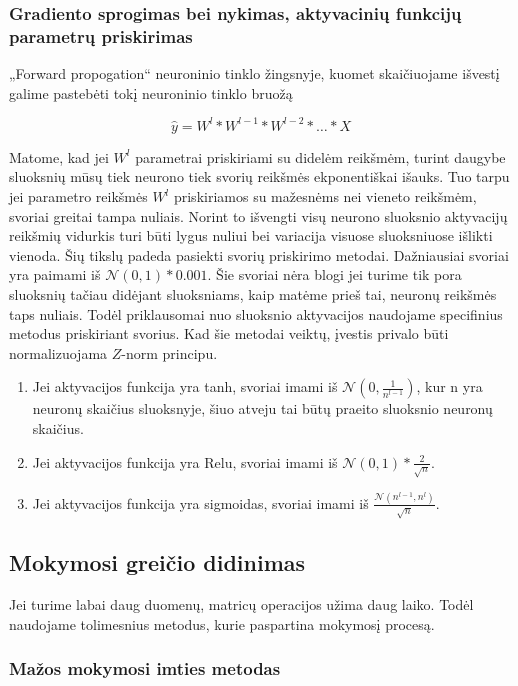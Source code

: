 \documentclass[a4paper, 12pt]{article}
\begin{document}
%
\subsubsection{Gradiento sprogimas bei nykimas, aktyvacinių funkcijų parametrų priskirimas}
%

„Forward propogation“ neuroninio tinklo žingsnyje, kuomet skaičiuojame išvestį galime pastebėti tokį neuroninio tinklo bruožą

$$
\hat{y}=W^{l} * W^{l-1} * W^{l-2} * \ldots * X
$$

Matome, kad jei $W^l$ parametrai priskiriami su didelėm reikšmėm, turint daugybe sluoksnių mūsų tiek neurono tiek svorių reikšmės ekponentiškai išauks. Tuo tarpu jei parametro reikšmės $W^l$ priskiriamos su mažesnėms nei vieneto reikšmėm, svoriai greitai tampa nuliais. Norint to išvengti visų neurono sluoksnio aktyvacijų reikšmių vidurkis turi būti lygus nuliui bei variacija visuose sluoksniuose išlikti vienoda. Šių tikslų padeda pasiekti svorių priskirimo metodai. Dažniausiai svoriai yra paimami iš $\mathcal{N}(0,1)\ast0.001$. Šie svoriai nėra blogi jei turime tik pora sluoksnių tačiau didėjant sluoksniams, kaip matėme prieš tai, neuronų reikšmės taps nuliais. Todėl priklausomai nuo sluoksnio aktyvacijos naudojame specifinius metodus priskiriant svorius. Kad šie metodai veiktų, įvestis privalo būti normalizuojama $Z$-norm principu. 

\begin{enumerate}
  \addtolength{\itemsep}{-0.5\baselineskip} 
  \item 	Jei aktyvacijos funkcija yra tanh, svoriai imami iš $\mathcal{N}(0,\frac{1}{n^{l-1}})$, kur n yra neuronų skaičius sluoksnyje, šiuo atveju tai būtų praeito sluoksnio neuronų skaičius.
  \item 	Jei aktyvacijos funkcija yra Relu, svoriai imami iš $\mathcal{N}(0,1)\ast\frac{2}{\sqrt n}$.
  \item 	Jei aktyvacijos funkcija yra sigmoidas, svoriai imami iš $\frac{\mathcal{N}(n^{l-1},n^l)}{\sqrt n}$.
\end{enumerate}

%
\subsection{Mokymosi greičio didinimas }
%
Jei turime labai daug duomenų, matricų operacijos užima daug laiko. Todėl naudojame tolimesnius metodus, kurie paspartina mokymosį procesą.

%
\subsubsection{Mažos mokymosi imties metodas}
%
\end{document}
